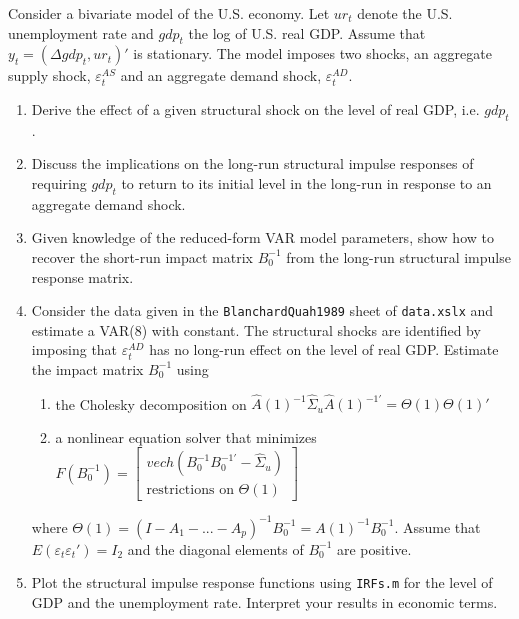 Consider a bivariate model of the U.S. economy. Let $ur_t$ denote the U.S. unemployment rate
and $gdp_t$ the log of U.S. real GDP. Assume that $y_t = (\Delta gdp_t, ur_t)'$ is stationary. The model imposes two shocks, an aggregate supply shock, $\varepsilon_t^{AS}$ and an aggregate demand shock, $\varepsilon_t^{AD}$.

\begin{enumerate}
    \item Derive the effect of a given structural shock on the level of real GDP, i.e. $gdp_t$.
    \item Discuss the implications  on the long-run structural impulse responses of requiring $gdp_t$ to return to its initial level in the long-run in response to an aggregate demand shock.
    \item Given knowledge of the reduced-form VAR model parameters, show how to recover the short-run impact matrix $B_0^{-1}$ from the long-run structural impulse response matrix.
    \item Consider the data given in the \texttt{BlanchardQuah1989} sheet of \texttt{data.xslx} and estimate a VAR(8) with constant. The structural shocks are identified by imposing that $\varepsilon_t^{AD}$ has no long-run effect on the level of real GDP. Estimate the impact matrix $B_0^{-1}$ using
          \begin{enumerate}
              \item the Cholesky decomposition on $\hat{A}(1)^{-1}\hat{\Sigma}_u\hat{A}(1)^{-1'}= \Theta(1) \Theta(1)'$
              \item a nonlinear equation solver that minimizes $F(B_0^{-1}) = \begin{bmatrix}
                            vech(B_0^{-1}B_0^{-1'}-\hat{\Sigma}_u) \\
                            \text{restrictions on } \Theta(1)
                        \end{bmatrix}$
          \end{enumerate}
          where $\Theta(1)=(I-A_1-...-A_p)^{-1}B_0^{-1} = A(1)^{-1}B_0^{-1}$. Assume that
          $E(\varepsilon_t\varepsilon_t')=I_2$ and the diagonal elements of $B_0^{-1}$ are positive.
    \item Plot the structural impulse response functions using \texttt{IRFs.m} for the level of GDP and the unemployment rate. Interpret your results in economic terms.
\end{enumerate}